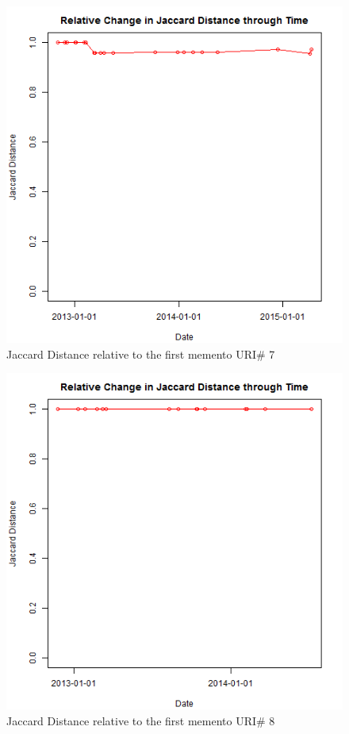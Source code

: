 \begin{figure}[ht]
	\begin{center}
		 \includegraphics[scale=0.60]{url7}
		  \caption{Jaccard Distance relative to the first memento URI\# 7}
	 \end{center}
\end{figure}
\begin{figure}[ht]
	\begin{center}
		 \includegraphics[scale=0.60]{url8}
		  \caption{Jaccard Distance relative to the first memento URI\# 8}
	 \end{center}
\end{figure}
